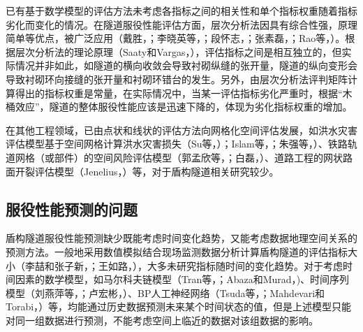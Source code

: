 已有基于数学模型的评估方法未考虑各指标之间的相关性和单个指标权重随着指标劣化而变化的情况。在隧道服役性能评估方面，层次分析法因具有综合性强，原理简单等优点，被广泛应用（戴胜，\citeyear{戴胜2008越江盾构隧道耐久性分析与评估体系研究}；李晓英等，\citeyear{李晓英2008铁路隧道健康状态模糊评价体系研究}；段怀志，\citeyear{段怀志2009隧道及地下工程健康评估研究}；张素磊，\citeyear{张素磊2012隧道衬砌结构健康诊断及技术状况评定研究}；Rao等，\citeyear{rao2016fuzzy}）。根据层次分析法的理论原理（Saaty和Vargas，\citeyear{saaty2012models}），评估指标之间是相互独立的，但实际情况并非如此，如隧道的横向收敛会导致衬砌纵缝的张开量，隧道的纵向变形会导致衬砌环向接缝的张开量和衬砌环错台的发生。另外，由层次分析法评判矩阵计算得出的指标权重是常量，在实际情况中，当某一评估指标劣化严重时，根据“木桶效应”，隧道的整体服役性能应该是迅速下降的，体现为劣化指标权重的增加。

在其他工程领域，已由点状和线状的评估方法向网格化空间评估发展，如洪水灾害评估模型基于空间网格计算洪水灾害损失（Su等，\citeyear{su2005grid}）；Islam等，\citeyear{islam2007grid}；朱强等，\citeyear{朱强2007基于网格的洪水损失计算模型}）、铁路轨道网格（或部件）的空间风险评估模型（郭孟欣等，\citeyear{郭孟欣2016基于网格的铁路建设工程风险指数评价模型研究}；白磊，\citeyear{白磊2017铁路轨道健康管理网格化分析决策模型研究}）、道路工程的网状路面开裂评估模型（Jenelius，\citeyear{jenelius2012road}）等，对于盾构隧道相关研究较少。

\subsection{服役性能预测的问题}

盾构隧道服役性能预测缺少既能考虑时间变化趋势，又能考虑数据地理空间关系的预测方法。一般地采用数值模拟结合现场监测数据分析计算盾构隧道的评估指标大小（李喆和张子新，\citeyear{李喆2005相邻隧道施工对上海地铁二号线的影响分析}；王如路，\citeyear{王如路2009上海软土地铁隧道变形影响因素及变形特征分析}），大多未研究指标随时间的变化趋势。对于考虑时间因素的数学模型，如马尔科夫链模型（Tran等，\citeyear{tran2008prediction}；Abaza和Murad，\citeyear{abaza2009predicting})、时间序列模型（刘燕萍等，\citeyear{刘燕萍2010时间序列分析在建筑物变形监测中的应用}；卢宏彬，\citeyear{卢宏彬2016基于时间序列的结构损伤概率方法研究}）、BP人工神经网络（Tsuda等，\citeyear{tsuda2006estimating}；Mahdevari和Torabi，\citeyear{mahdevari2012prediction}）等，均能通过历史数据预测未来某个时间状态的值，但是上述模型只能对同一组数据进行预测，不能考虑空间上临近的数据对该组数据的影响。

